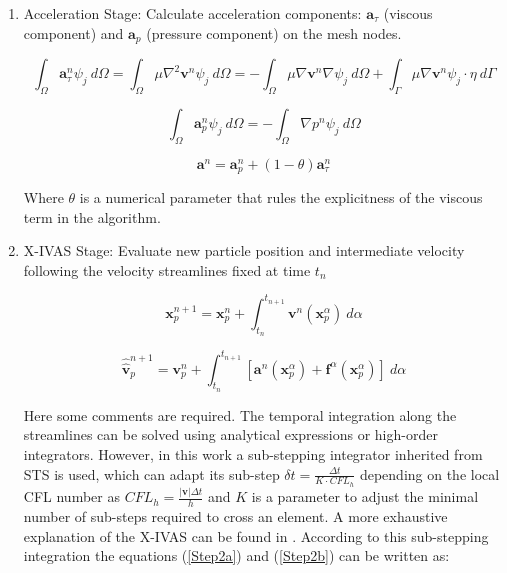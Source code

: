 \begin{enumerate}
  \item Acceleration Stage: Calculate acceleration components: $\mathbf{a}_{\tau}$ (viscous component) and $\mathbf{a}_{p}$ (pressure component) on the mesh nodes.


  \begin{equation}\label{Step1a}
\int_{\Omega}\mathbf{a}^{n}_{\tau}\psi_j\ d\Omega=\int_{\Omega}\mu \nabla^{2}\mathbf{v}^{n} \psi_j\ d\Omega=-\int_{\Omega}\mu \nabla\mathbf{v}^{n} \nabla \psi_j\ d\Omega + \int_{\Gamma}\mu \nabla\mathbf{v}^{n} \psi_j \cdot \eta \ d\Gamma
\end{equation}

\begin{equation}\label{Step1b}
\int_{\Omega}\mathbf{a}^{n}_{p}\psi_j\ d\Omega=-\int_{\Omega}\nabla p^{n} \psi_j\ d\Omega
\end{equation}

\begin{equation}\label{Step1c}
\mathbf{a}^{n}=\mathbf{a}^{n}_{p} + (1-\theta)\mathbf{a}^{n}_{\tau}
\end{equation}

Where $\theta$ is a numerical parameter that rules the explicitness of the viscous term in the algorithm.

  \item X-IVAS Stage: Evaluate new particle position and intermediate velocity following the velocity streamlines fixed at time $t_n$

  \begin{equation}\label{Step2a}
\mathbf{x}^{n+1}_{p}=\mathbf{x}^{n}_{p} + \int_{t_n}^{t_{n+1}} \mathbf{v}^{n}(\mathbf{x}_p^{\alpha}) \ d\alpha
\end{equation}

\begin{equation}\label{Step2b}
\displaystyle \widehat{\widehat{\mathbf{v}}}^{n+1}_{p}=\mathbf{v}^{n}_{p} +
\int_{t_n}^{t_{n+1}} \left[ \mathbf{a}^{n}(\mathbf{x}_p^{\alpha}) + \mathbf{f}^{\alpha} (\mathbf{x}_p^{\alpha}) \right]
 \ d\alpha
\end{equation}

Here some comments are required. The temporal integration along the streamlines can be solved using analytical expressions\cite{Idelsohn12} or high-order integrators\cite{Nair2003275}. However, in this work a sub-stepping integrator inherited from STS\cite{Alexiades96} is used, which can adapt its sub-step $\delta t=\frac{\Delta t}{K\cdot CFL_h}$ depending on the local CFL number as $CFL_h=\frac{|\mathbf{v}|\Delta t}{h}$ and $K$ is a parameter to adjust the minimal number of sub-steps required to cross an element. A more exhaustive explanation of the X-IVAS can be found in \cite{Nigro11}. According to this sub-stepping integration the equations (\ref{Step2a}) and (\ref{Step2b}) can be written as:


\end{enumerate}
